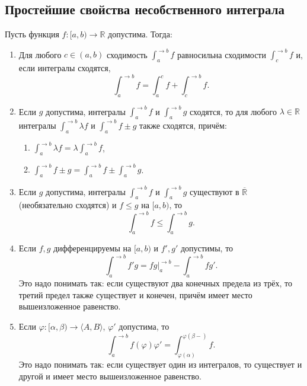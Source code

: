 \subsection{Простейшие свойства несобственного интеграла}

\hypertarget{svva}{}
\begin{theorem}
	Пусть функция \(f \colon [a, b) \to \mathbb{R}\) допустима. Тогда:
	\begin{enumerate}
		\item Для любого \(c \in (a, b)\) сходимость \(\int_a^{\to b} f\) равносильна сходимости \(\int_c^{\to b} f\) и, если интегралы сходятся, \[
		\int_a^{\to b} f = \int_a^c f + \int_c^{\to b} f.
		\]
		\item Если \(g\) допустима, интегралы \(\int_a^{\to b} f\) и \(\int_a^{\to b} g\) сходятся, то для любого \(\lambda \in \mathbb{R}\) интегралы \(\int_a^{\to b} \lambda f\) и \(\int_a^{\to b} f \pm g\) также сходятся, причём:
		\begin{enumerate}
			\item \(\displaystyle\int_a^{\to b} \lambda f = \lambda \displaystyle\int_a^{\to b} f\),
			\item \(\displaystyle\int_a^{\to b} f \pm g = \displaystyle\int_a^{\to b} f \pm \displaystyle\int_a^{\to b} g\).
		\end{enumerate}
		\item Если \(g\) допустима, интегралы \(\int_a^{\to b} f\) и \(\int_a^{\to b} g\) существуют в \(\overline{\mathbb{R}}\) (необязательно сходятся) и \(f \leqslant g\) на \([a, b)\), то \[
		\int_a^{\to b} f \leqslant \int_a^{\to b} g.
		\]
		\item Если \(f, g\) дифференцируемы на \([a, b)\) и \(f', g'\) допустимы, то \[
		\int_a^{\to b} f'g = fg \bigg|_a^{\to b} - \int_a^{\to b} fg'.
		\]
		Это надо понимать так: если существуют два конечных предела из трёх, то третий предел также существует и конечен, причём имеет место вышеизложенное равенство.
		\item Если \(\varphi \colon [\alpha, \beta) \to \langle A, B \rangle\), \(\varphi'\) допустима, то \[
		\int_a^{\to b} f(\varphi) \varphi' = \int_{\varphi(\alpha)}^{\varphi(\beta-)} f.
		\]
		Это надо понимать так: если существует один из интегралов, то существует и другой и имеет место вышеизложенное равенство.
	\end{enumerate}
\end{theorem}

